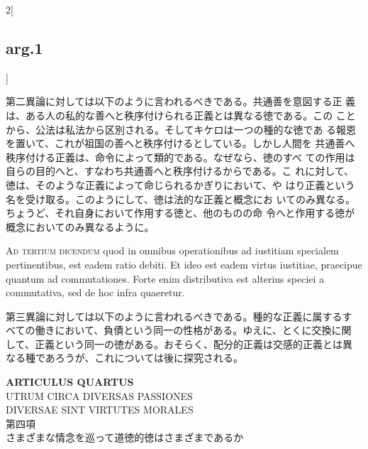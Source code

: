 \documentclass[paper=a4paper,fontsize=10pt,jafontsize=9pt,titlepage]{jlreq}
\begin{document}
\begin{paracol}{2}[\subsection{arg.1}]
\switchcolumn

第二異論に対しては以下のように言われるべきである。共通善を意図する正
 義は、ある人の私的な善へと秩序付けられる正義とは異なる徳である。この
 ことから、公法は私法から区別される。そしてキケロは一つの種的な徳であ
 る報恩を置いて、これが祖国の善へと秩序付けるとしている。しかし人間を
 共通善へ秩序付ける正義は、命令によって類的である。なぜなら、徳のすべ
 ての作用は自らの目的へと、すなわち共通善へと秩序付けるからである。こ
 れに対して、徳は、そのような正義によって命じられるかぎりにおいて、や
 はり正義という名を受け取る。このようにして、徳は法的な正義と概念にお
 いてのみ異なる。ちょうど、それ自身において作用する徳と、他のものの命
 令へと作用する徳が概念においてのみ異なるように。

\switchcolumn*[\subsection{ad.3}]

{\scshape Ad tertium dicendum} quod in omnibus operationibus ad
iustitiam specialem pertinentibus, est eadem ratio debiti. Et ideo est
eadem virtus iustitiae, praecipue quantum ad commutationes. Forte enim
distributiva est alterius speciei a commutativa, sed de hoc infra
quaeretur.

\switchcolumn

第三異論に対しては以下のように言われるべきである。種的な正義に属するす
べての働きにおいて、負債という同一の性格がある。ゆえに、とくに交換に関
して、正義という同一の徳がある。おそらく、配分的正義は交感的正義とは異
なる種であろうが、これについては後に探究される。

\end{paracol}
\newpage
{}
{}
\setcounter{section}{4}
\setcounter{subsection}{0}



\begin{center}
{\Large {\bfseries ARTICULUS QUARTUS}}\\
{\large UTRUM CIRCA DIVERSAS PASSIONES\\DIVERSAE SINT VIRTUTES MORALES}\\
 {\Large 第四項\\さまざまな情念を巡って道徳的徳はさまざまであるか}
\end{center}
\end{document}
